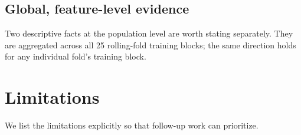 \subsection{Global, feature-level evidence}

Two descriptive facts at the population level are worth stating
separately. They are aggregated across all 25 rolling-fold training
blocks; the same direction holds for any individual fold's training
block.

\section{Limitations}\label{sec:lim}

We list the limitations explicitly so that follow-up work can
prioritize.

